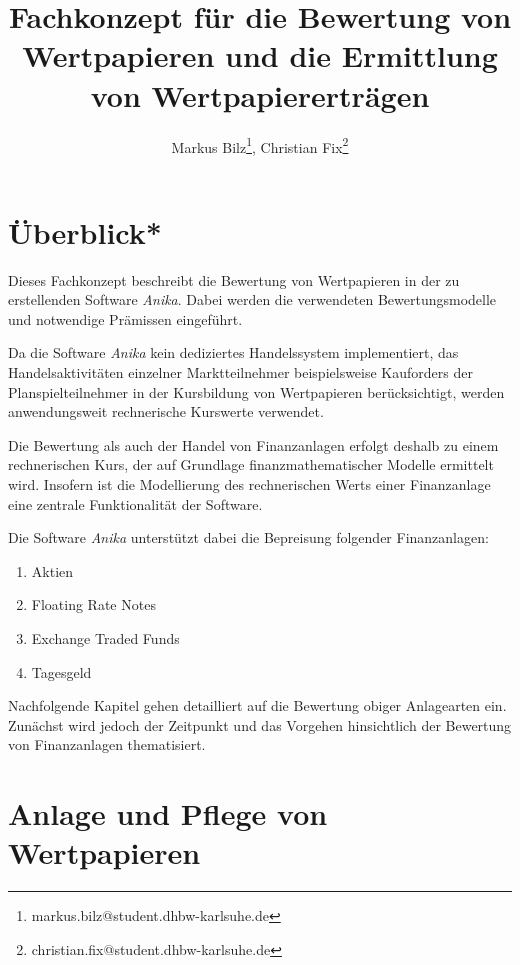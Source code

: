 \documentclass[12pt, a4paper]{article}
\title{Fachkonzept für die Bewertung von Wertpapieren und die Ermittlung von Wertpapiererträgen}
\author{Markus Bilz\thanks{markus.bilz@student.dhbw-karlsuhe.de}, Christian Fix\thanks{christian.fix@student.dhbw-karlsuhe.de}}
\begin{document}
\maketitle

\section{Überblick*}
Dieses Fachkonzept beschreibt die Bewertung von Wertpapieren in der zu erstellenden Software \textit{Anika}. 
Dabei werden die verwendeten Bewertungsmodelle und notwendige Prämissen eingeführt.

Da die Software \textit{Anika} kein dediziertes Handelssystem implementiert, das Handelsaktivitäten einzelner Marktteilnehmer beispielsweise Kauforders der Planspielteilnehmer in der Kursbildung von Wertpapieren berücksichtigt, werden anwendungsweit rechnerische Kurswerte verwendet. 

Die Bewertung als auch der Handel von Finanzanlagen erfolgt deshalb zu einem rechnerischen Kurs, der auf Grundlage finanzmathematischer Modelle ermittelt wird. Insofern ist die Modellierung des rechnerischen Werts einer Finanzanlage eine zentrale Funktionalität der Software.

Die Software \textit{Anika} unterstützt dabei die Bepreisung folgender Finanzanlagen:
\begin{enumerate}
	\item Aktien
	\item Floating Rate Notes
	\item Exchange Traded Funds
	\item Tagesgeld
\end{enumerate}

Nachfolgende Kapitel gehen detailliert auf die Bewertung obiger Anlagearten ein. Zunächst wird jedoch der Zeitpunkt und das Vorgehen hinsichtlich der Bewertung von Finanzanlagen thematisiert.

\section{Anlage und Pflege von Wertpapieren}
\label{sec:anlage_und_pflege_der_wertpapiere}
\end{document}
